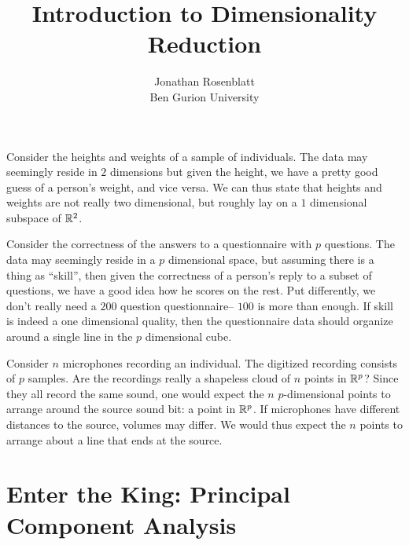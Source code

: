 \documentclass[12pt,a4paper]{article}
\author{Jonathan Rosenblatt \\ Ben Gurion University}
\title{Introduction to Dimensionality Reduction}
\begin{document}
\maketitle

\tableofcontents

\hrulefill

\begin{example}[BMI]
	\label{ex:bmi}
	Consider the heights and weights of a sample of individuals. 
	The data may seemingly reside in $2$ dimensions but given the height, we have a pretty good guess of a person's weight, and vice versa. 
	We can thus state that heights and weights are not really two dimensional, but roughly lay on a $1$ dimensional subspace of $\mathbb{R}^2$. 
\end{example}


\begin{example}[g-factor]
	\label{ex:iq}
	Consider the correctness of the answers to a questionnaire with $p$ questions. 
	The data may seemingly reside in a $p$ dimensional space, but assuming there is a thing as ``skill'', then given the correctness of a person's reply to a subset of questions, we have a good idea how he scores on the rest. 
	Put differently, we don't really need a $200$ question questionnaire-- $100$ is more than enough.
	If skill is indeed a one dimensional quality, then the questionnaire data should organize around a single line in the $p$ dimensional cube. 
\end{example}



\begin{example}
	\label{ex:blind-signal}
	Consider $n$ microphones recording an individual. 
	The digitized recording consists of $p$ samples. 
	Are the recordings really a shapeless cloud of $n$ points in $\mathbb{R}^p$?
	Since they all record the same sound, one would expect the $n$ $p$-dimensional points to arrange around the source sound bit: a point in $\mathbb{R}^p$.
	If microphones have different distances to the source, volumes may differ. 
	We would thus expect the $n$ points to arrange about a line that ends at the source. 	
\end{example}
		
	






\section{Enter the King: Principal Component Analysis}
\label{sec:pca}
\end{document}
